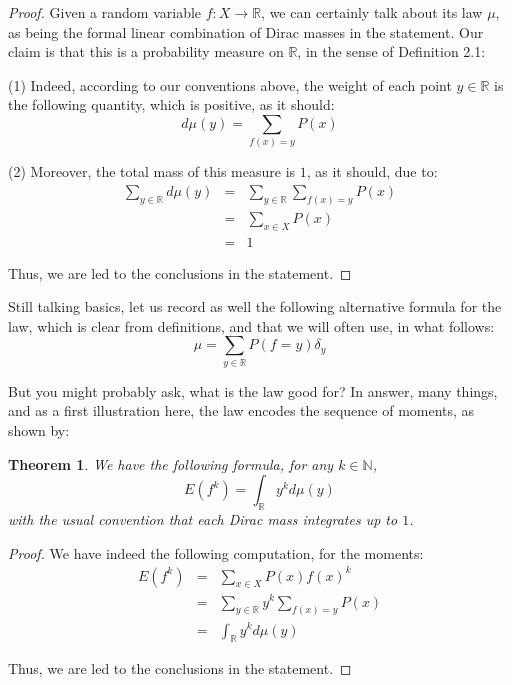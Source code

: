\documentclass[12pt]{amsbook}
\newtheorem{theorem}{Theorem}[chapter]
\begin{document}
\begin{proof}
Given a random variable $f:X\to\mathbb R$, we can certainly talk about its law $\mu$, as being the formal linear combination of Dirac masses in the statement. Our claim is that this is a probability measure on $\mathbb R$, in the sense of Definition 2.1:

\medskip

(1) Indeed, according to our conventions above, the weight of each point $y\in\mathbb R$ is the following quantity, which is positive, as it should:
$$d\mu(y)=\sum_{f(x)=y}P(x)$$

(2) Moreover, the total mass of this measure is $1$, as it should, due to:
\begin{eqnarray*}
\sum_{y\in\mathbb R}d\mu(y)
&=&\sum_{y\in\mathbb R}\sum_{f(x)=y}P(x)\\
&=&\sum_{x\in X}P(x)\\
&=&1
\end{eqnarray*}

Thus, we are led to the conclusions in the statement.
\end{proof}

Still talking basics, let us record as well the following alternative formula for the law, which is clear from definitions, and that we will often use, in what follows:
$$\mu=\sum_{y\in\mathbb R}P(f=y)\delta_y$$

But you might probably ask, what is the law good for? In answer, many things, and as a first illustration here, the law encodes the sequence of moments, as shown by:


\begin{theorem}
We have the following formula, for any $k\in\mathbb N$,
$$E(f^k)=\int_\mathbb Ry^kd\mu(y)$$
with the usual convention that each Dirac mass integrates up to $1$.
\end{theorem}

\begin{proof}
We have indeed the following computation, for the moments:
\begin{eqnarray*}
E(f^k)
&=&\sum_{x\in X}P(x)f(x)^k\\
&=&\sum_{y\in\mathbb R}y^k\sum_{f(x)=y}P(x)\\
&=&\int_\mathbb Ry^kd\mu(y)
\end{eqnarray*}

Thus, we are led to the conclusions in the statement.
\end{proof}
\end{document}
